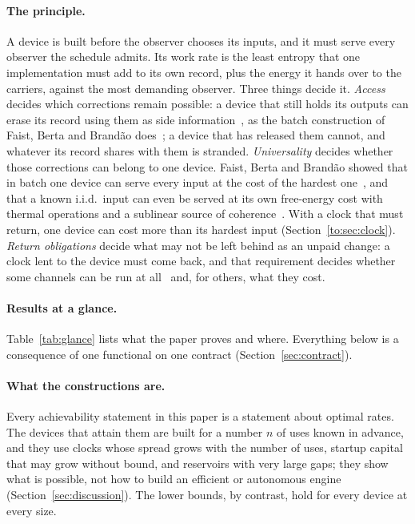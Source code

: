 \paragraph{The principle.} A device is built before the observer chooses its inputs, and it must serve every observer the schedule admits. Its work rate is the least entropy that one implementation must add to its own record, plus the energy it hands over to the carriers, against the most demanding observer. Three things decide it. \emph{Access} decides which corrections remain possible: a device that still holds its outputs can erase its record using them as side information~\cite{delRio11}, as the batch construction of Faist, Berta and Brand\~ao does~\cite[Sec.~7]{FBB21}; a device that has released them cannot, and whatever its record shares with them is stranded. \emph{Universality} decides whether those corrections can belong to one device. Faist, Berta and Brand\~ao showed that in batch one device can serve every input at the cost of the hardest one~\cite{FBB19,FBB21}, and that a known i.i.d.\ input can even be served at its own free-energy cost with thermal operations and a sublinear source of coherence~\cite[Prop.~8.3]{FBB21}. With a clock that must return, one device can cost more than its hardest input (Section~\ref{to:sec:clock}). \emph{Return obligations} decide what may not be left behind as an unpaid change: a clock lent to the device must come back, and that requirement decides whether some channels can be run at all~\cite{MarvianSpekkens19,LostaglioMuller19} and, for others, what they cost.

\paragraph{Results at a glance.} Table~\ref{tab:glance} lists what the paper proves and where. Everything below is a consequence of one functional on one contract (Section~\ref{sec:contract}).

\paragraph{What the constructions are.} Every achievability statement in this paper is a statement about optimal rates. The devices that attain them are built for a number $n$ of uses known in advance, and they use clocks whose spread grows with the number of uses, startup capital that may grow without bound, and reservoirs with very large gaps; they show what is possible, not how to build an efficient or autonomous engine (Section~\ref{sec:discussion}). The lower bounds, by contrast, hold for every device at every size.

